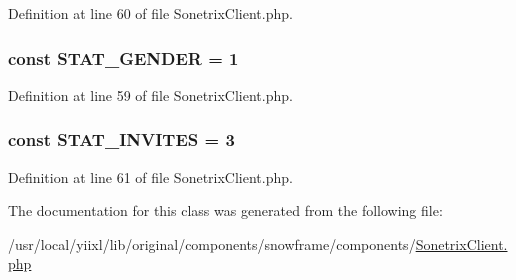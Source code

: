 Definition at line 60 of file SonetrixClient.php.

\hypertarget{classSonetrixClient_a09f6e412c2a4aafdd9e16c7bf9c4ec85}{
\subsubsection[{STAT\_\-GENDER}]{\setlength{\rightskip}{0pt plus 5cm}const {\bf STAT\_\-GENDER} = 1}}
\label{classSonetrixClient_a09f6e412c2a4aafdd9e16c7bf9c4ec85}


Definition at line 59 of file SonetrixClient.php.

\hypertarget{classSonetrixClient_aaa7126588b810c9b0d17b81922be0a88}{
\subsubsection[{STAT\_\-INVITES}]{\setlength{\rightskip}{0pt plus 5cm}const {\bf STAT\_\-INVITES} = 3}}
\label{classSonetrixClient_aaa7126588b810c9b0d17b81922be0a88}


Definition at line 61 of file SonetrixClient.php.



The documentation for this class was generated from the following file:\begin{DoxyCompactItemize}
\item 
/usr/local/yiixl/lib/original/components/snowframe/components/\hyperlink{SonetrixClient_8php}{SonetrixClient.php}\end{DoxyCompactItemize}
